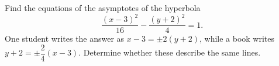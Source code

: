 Find the equations of the asymptotes of the hyperbola
\[\dfrac{(x-3)^2}{16}-\dfrac{(y+2)^2}{4}=1 .\]
One student writes the answer as $x-3=\pm 2(y+2)$, while a book writes $y+2=\pm\dfrac{2}{4}(x-3)$. Determine whether these describe the same lines.
